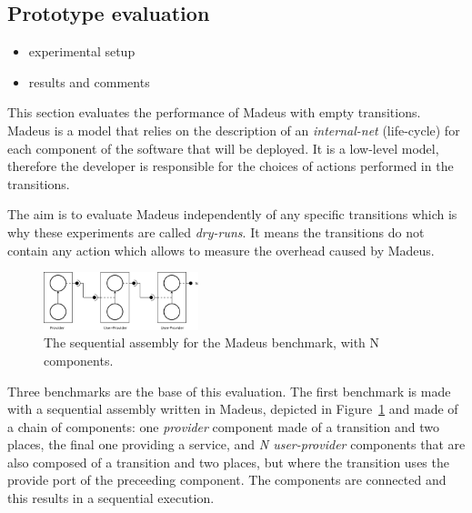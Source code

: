 
\subsection{Prototype evaluation}

\begin{itemize}
\item experimental setup
\item results and comments
\end{itemize}
This section evaluates the performance of Madeus with empty transitions.
Madeus is a model that relies on the description of an \emph{internal-net} (life-cycle) for each component of the software that will be deployed. It is a low-level model, therefore the developer is responsible for the choices of actions performed in the transitions.

The aim is to evaluate Madeus independently of any specific transitions which is why these experiments are called \emph{dry-runs}. It means the transitions do not contain any action which allows to measure the overhead caused by Madeus.


\begin{figure}[h]
  \begin{center}
    \includegraphics[width=0.4\textwidth]{./images/seq.pdf}
    \caption{The sequential assembly for the Madeus benchmark, with N components.}
    \label{fig:seq}
  \end{center}
\end{figure}

Three benchmarks are the base of this evaluation. The first benchmark is made with a sequential assembly written in Madeus, depicted in Figure~\ref{fig:seq}
and made of a chain of components: one \emph{provider} component made of a transition and two places, the final one providing a service, and \emph{N user-provider} components that are also composed of a transition and two places, but where the transition uses the provide port of the preceeding component. The components are connected and this results in a sequential execution.

